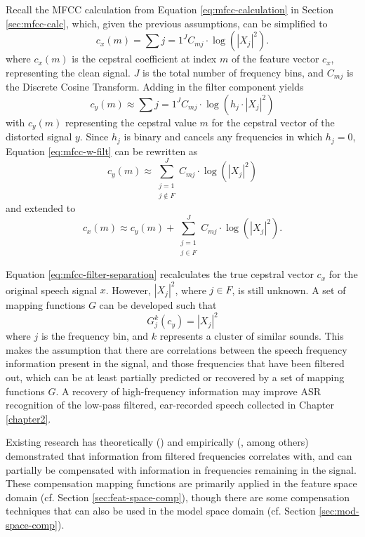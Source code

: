 Recall the MFCC calculation from Equation \ref{eq:mfcc-calculation} in Section \ref{sec:mfcc-calc}, which, given the previous assumptions, can be simplified to \begin{equation} c_x(m) = \sum{j=1}^{J} C_{mj} \cdot \log(|X_{j}|^2). \end{equation} where $c_x(m)$ is the cepstral coefficient at index $m$ of the feature vector $c_x$, representing the clean signal. $J$ is the total number of frequency bins, and $C_{mj}$ is the Discrete Cosine Transform.  Adding in the filter component yields \begin{equation}\label{eq:mfcc-w-filt} c_y(m) \approx \sum{j=1}^{J} C_{mj} \cdot \log(h_j \cdot |X_{j}|^2) \end{equation} with $c_y(m)$ representing the cepstral value $m$ for the cepstral vector of the distorted signal $y$.  Since $h_j$ is binary and cancels any frequencies in which $h_j=0$, Equation \ref{eq:mfcc-w-filt} can be rewritten as \begin{equation} c_y(m) \approx \sum_{\substack{j=1\\j\notin F}}^J C_{mj} \cdot \log(|X_j|^2) \end{equation} and extended to \begin{equation}\label{eq:mfcc-filter-separation} c_x(m) \approx c_y(m) + \sum_{\substack{j=1\\j\in F}}^J C_{mj} \cdot \log(|X_j|^2). \end{equation}
  
Equation \ref{eq:mfcc-filter-separation} recalculates the true cepstral vector $c_x$ for the original speech signal $x$.  However, $|X_j|^2$, where $j\in F$, is still unknown.  A set of mapping functions $G$ can be developed such that \begin{equation} G_j^k(c_{y}) = |X_j|^2 \end{equation} where $j$ is the frequency bin, and $k$ represents a cluster of similar sounds.  This makes the assumption that there are correlations between the speech frequency information present in the signal, and those frequencies that have been filtered out, which can be at least partially predicted or recovered by a set of mapping functions $G$. A recovery of high-frequency information may improve ASR recognition of the low-pass filtered, ear-recorded speech collected in Chapter \ref{chapter2}.

Existing research has theoretically (\cite{morales:09}) and empirically (\cite{morales:05b,morales:09,he:11}, among others) demonstrated that information from filtered frequencies correlates with, and can partially be compensated with information in frequencies remaining in the signal.  These compensation mapping functions are primarily applied in the feature space domain (cf. Section \ref{sec:feat-space-comp}), though there are some compensation techniques that can also be used in the model space domain (cf. Section \ref{sec:mod-space-comp}).


